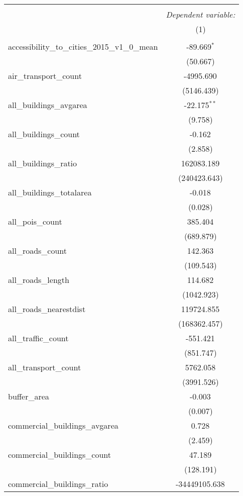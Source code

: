 \begin{table}[!htbp] \centering
\begin{tabular}{@{\extracolsep{5pt}}lc}
\\[-1.8ex]\hline
\hline \\[-1.8ex]
& \multicolumn{1}{c}{\textit{Dependent variable:}} \
\cr \cline{1-2}
\\[-1.8ex] & (1) \\
\hline \\[-1.8ex]
 accessibility_to_cities_2015_v1_0_mean & -89.669$^{*}$ \\
  & (50.667) \\
 air_transport_count & -4995.690$^{}$ \\
  & (5146.439) \\
 all_buildings_avgarea & -22.175$^{**}$ \\
  & (9.758) \\
 all_buildings_count & -0.162$^{}$ \\
  & (2.858) \\
 all_buildings_ratio & 162083.189$^{}$ \\
  & (240423.643) \\
 all_buildings_totalarea & -0.018$^{}$ \\
  & (0.028) \\
 all_pois_count & 385.404$^{}$ \\
  & (689.879) \\
 all_roads_count & 142.363$^{}$ \\
  & (109.543) \\
 all_roads_length & 114.682$^{}$ \\
  & (1042.923) \\
 all_roads_nearestdist & 119724.855$^{}$ \\
  & (168362.457) \\
 all_traffic_count & -551.421$^{}$ \\
  & (851.747) \\
 all_transport_count & 5762.058$^{}$ \\
  & (3991.526) \\
 buffer_area & -0.003$^{}$ \\
  & (0.007) \\
 commercial_buildings_avgarea & 0.728$^{}$ \\
  & (2.459) \\
 commercial_buildings_count & 47.189$^{}$ \\
  & (128.191) \\
 commercial_buildings_ratio & -34449105.638$^{}$ \\

\end{tabular}
\end{table}
